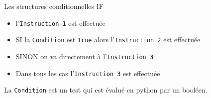 \begin{easybox}{Les structures conditionnelles IF}
\begin{minipage}{0.65\linewidth}
	
	\begin{itemize}
		\item l'\verb+Instruction 1+ est effectuée
		\item SI la \verb+Condition+ est \verb+True+ alors l'\verb+Instruction 2+ est effectuée
		\item SINON on va directement à l'\verb+Instruction 3+
		\item Dans tous les cas l'\verb+Instruction 3+ est effectuée
	\end{itemize}
	
	La \verb+Condition+ est un test qui est évalué en python par un booléen.
	
	\end{minipage}

\end{easybox}


